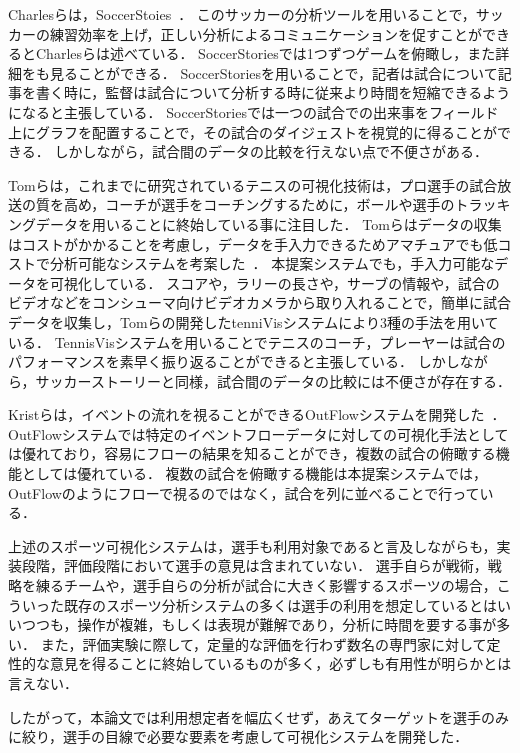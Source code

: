 \documentclass[sotsuron]{kuee}
\begin{document}
	Charlesらは，SoccerStoies~\cite{SoccerStory}．
	このサッカーの分析ツールを用いることで，サッカーの練習効率を上げ，正しい分析によるコミュニケーションを促すことができるとCharlesらは述べている．
	SoccerStoriesでは1つずつゲームを俯瞰し，また詳細をも見ることができる．
	SoccerStoriesを用いることで，記者は試合について記事を書く時に，監督は試合について分析する時に従来より時間を短縮できるようになると主張している．
	SoccerStoriesでは一つの試合での出来事をフィールド上にグラフを配置することで，その試合のダイジェストを視覚的に得ることができる．
	しかしながら，試合間のデータの比較を行えない点で不便さがある．
	
	Tomらは，これまでに研究されているテニスの可視化技術は，プロ選手の試合放送の質を高め，コーチが選手をコーチングするために，ボールや選手のトラッキングデータを用いることに終始している事に注目した．
	Tomらはデータの収集はコストがかかることを考慮し，データを手入力できるためアマチュアでも低コストで分析可能なシステムを考案した~\cite{TenniVis}．
	本提案システムでも，手入力可能なデータを可視化している．
	スコアや，ラリーの長さや，サーブの情報や，試合のビデオなどをコンシューマ向けビデオカメラから取り入れることで，簡単に試合データを収集し，Tomらの開発したtenniVisシステムにより3種の手法を用いている．
	TennisVisシステムを用いることでテニスのコーチ，プレーヤーは試合のパフォーマンスを素早く振り返ることができると主張している．
	しかしながら，サッカーストーリーと同様，試合間のデータの比較には不便さが存在する．
	
	Kristらは，イベントの流れを視ることができるOutFlowシステムを開発した~\cite{Outflow}．
	OutFlowシステムでは特定のイベントフローデータに対しての可視化手法としては優れており，容易にフローの結果を知ることができ，複数の試合の俯瞰する機能としては優れている．
	複数の試合を俯瞰する機能は本提案システムでは，OutFlowのようにフローで視るのではなく，試合を列に並べることで行っている．

	上述のスポーツ可視化システムは，選手も利用対象であると言及しながらも，実装段階，評価段階において選手の意見は含まれていない．
	選手自らが戦術，戦略を練るチームや，選手自らの分析が試合に大きく影響するスポーツの場合，こういった既存のスポーツ分析システムの多くは選手の利用を想定しているとはいいつつも，操作が複雑，もしくは表現が難解であり，分析に時間を要する事が多い．
	また，評価実験に際して，定量的な評価を行わず数名の専門家に対して定性的な意見を得ることに終始しているものが多く，必ずしも有用性が明らかとは言えない．
	
	したがって，本論文では利用想定者を幅広くせず，あえてターゲットを選手のみに絞り，選手の目線で必要な要素を考慮して可視化システムを開発した．
	
\end{document}

